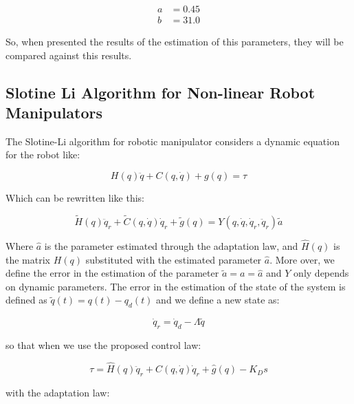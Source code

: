 \documentclass[journal]{IEEEtran}
\begin{document}
        \begin{align}   
            a &= 0.45 \\
            b &= 31.0
        \end{align}

        So, when presented the results of the estimation of this parameters, they will be compared against this results.

    \subsection{Slotine Li Algorithm for Non-linear Robot Manipulators}

        The Slotine-Li algorithm for robotic manipulator considers a dynamic equation for the robot\cite{Slotine1988} like:

        \begin{equation}
            H(q) \ddot{q} + C(q, \dot{q}) + g(q) = \tau
        \end{equation}

        Which can be rewritten like this:

        \begin{equation} \label{closedloopslotine}
            \tilde{H}(q) \ddot{q}_r + \tilde{C}(q, \dot{q}) \dot{q}_r + \tilde{g}(q) = Y(q, \dot{q}, \dot{q}_r, \ddot{q}_r) \tilde{a}
        \end{equation}

        Where $\hat{a}$ is the parameter estimated through the adaptation law, and $\hat{H}(q)$ is the matrix $H(q)$ substituted with the estimated parameter $\hat{a}$. More over, we define the error in the estimation of the parameter $\tilde{a} = a = \hat{a}$ and $Y$ only depends on dynamic parameters. The error in the estimation of the state of the system is defined as $\tilde{q}(t) = q(t) - q_d(t)$ and we define a new state as:

        \begin{equation}
            \dot{q}_r = \dot{q}_d - \Lambda \tilde{q}
        \end{equation}

        so that when we use the proposed control law:

        \begin{equation}
            \tau = \hat{H}(q) \ddot{q}_r + \hat{C}(q, \dot{q}) \dot{q}_r + \hat{g}(q) - K_D s
        \end{equation}

        with the adaptation law:
\end{document}
